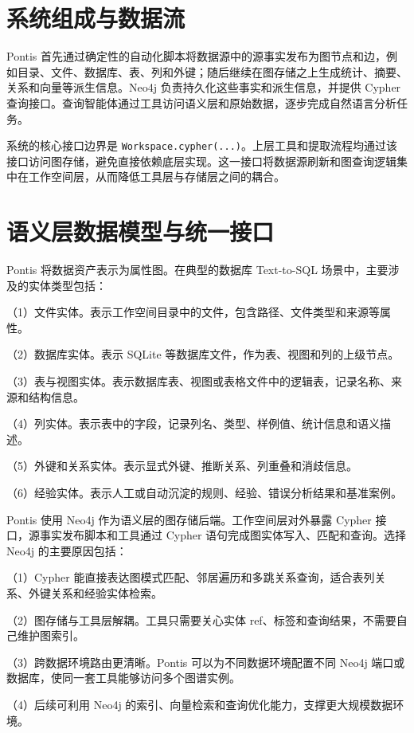 \documentclass[
    bachelor,
    pdflinks,
]{xjtuthesis}
\begin{document}
\section{系统组成与数据流}

Pontis 首先通过确定性的自动化脚本将数据源中的源事实发布为图节点和边，例如目录、文件、数据库、表、列和外键；随后继续在图存储之上生成统计、摘要、关系和向量等派生信息。Neo4j 负责持久化这些事实和派生信息，并提供 Cypher 查询接口。查询智能体通过工具访问语义层和原始数据，逐步完成自然语言分析任务。

系统的核心接口边界是 \texttt{Workspace.cypher(...)}。上层工具和提取流程均通过该接口访问图存储，避免直接依赖底层实现。这一接口将数据源刷新和图查询逻辑集中在工作空间层，从而降低工具层与存储层之间的耦合。

\section{语义层数据模型与统一接口}

Pontis 将数据资产表示为属性图。在典型的数据库 Text-to-SQL 场景中，主要涉及的实体类型包括：

（1）文件实体。表示工作空间目录中的文件，包含路径、文件类型和来源等属性。

（2）数据库实体。表示 SQLite 等数据库文件，作为表、视图和列的上级节点。

（3）表与视图实体。表示数据库表、视图或表格文件中的逻辑表，记录名称、来源和结构信息。

（4）列实体。表示表中的字段，记录列名、类型、样例值、统计信息和语义描述。

（5）外键和关系实体。表示显式外键、推断关系、列重叠和消歧信息。

（6）经验实体。表示人工或自动沉淀的规则、经验、错误分析结果和基准案例。

Pontis 使用 Neo4j 作为语义层的图存储后端。工作空间层对外暴露 Cypher 接口，源事实发布脚本和工具通过 Cypher 语句完成图实体写入、匹配和查询。选择 Neo4j 的主要原因包括：

（1）Cypher 能直接表达图模式匹配、邻居遍历和多跳关系查询，适合表列关系、外键关系和经验实体检索。

（2）图存储与工具层解耦。工具只需要关心实体 ref、标签和查询结果，不需要自己维护图索引。

（3）跨数据环境路由更清晰。Pontis 可以为不同数据环境配置不同 Neo4j 端口或数据库，使同一套工具能够访问多个图谱实例。

（4）后续可利用 Neo4j 的索引、向量检索和查询优化能力，支撑更大规模数据环境。
\end{document}
